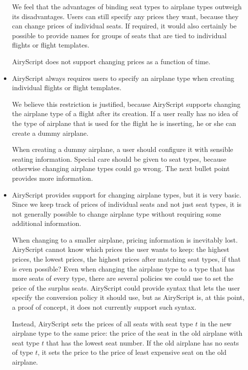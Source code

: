 \begin{itemize}
    We feel that the advantages of binding seat types to airplane types outweigh
    its disadvantages. Users can still specify any prices they want, because
    they can change prices of individual seats. If required, it would also
    certainly be possible to provide names for groups of seats that are tied to
    individual flights or flight templates.

    AiryScript does not support changing prices as a function of time.

  \item AiryScript always requires users to specify an airplane type when
    creating individual flights or flight templates.

    We believe this restriction is justified, because AiryScript supports
    changing the airplane type of a flight after its creation. If a user really
    has no idea of the type of airplane that is used for the flight he is
    inserting, he or she can create a dummy airplane.

    When creating a dummy airplane, a user should configure it
    with sensible seating information. Special care should be given to seat
    types, because otherwise changing airplane types could go wrong. The next
    bullet point provides more information.

  \item AiryScript provides support for changing airplane types, but it is very
    basic. Since we keep track of prices of individual seats and not just seat
    types, it is not generally possible to change airplane type without
    requiring some additional information.

    When changing to a smaller airplane, pricing information is inevitably lost.
    AiryScript cannot know which prices the user wants to keep: the highest
    prices, the lowest prices, the highest prices after matching seat types, if
    that is even possible? Even when changing the airplane type to a type that
    has more seats of every type, there are several policies we could use to set
    the price of the surplus seats.  AiryScript could provide syntax that lets
    the user specify the conversion policy it should use, but as AiryScript is,
    at this point, a proof of concept, it does not currently support such
    syntax.

    Instead, AiryScript sets the prices of all seats with seat type $t$ in the
    new airplane type to the same price: the price of the seat in the old
    airplane with seat type $t$ that has the lowest seat number. If the old
    airplane has no seats of type $t$, it sets the price to the price of least
    expensive seat on the old airplane.


\end{itemize}
